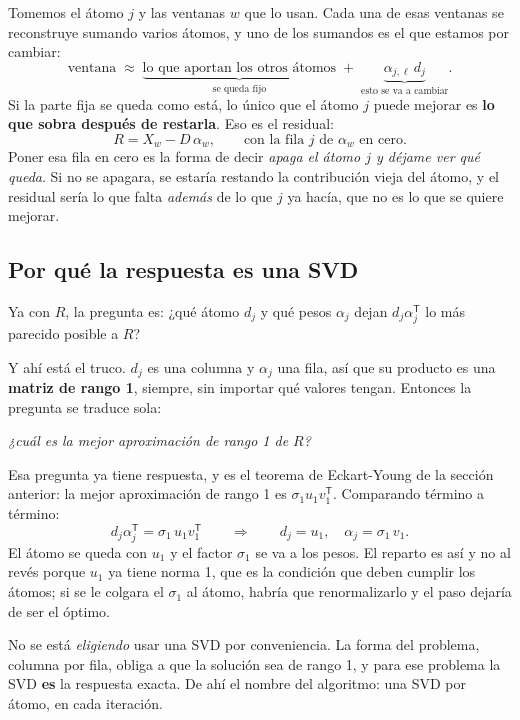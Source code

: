 \documentclass[11pt,letterpaper]{article}
\newcommand{\T}{^{\mathsf{T}}}
\begin{document}
Tomemos el átomo $j$ y las ventanas $w$ que lo usan. Cada una de esas
ventanas se reconstruye sumando varios átomos, y uno de los sumandos
es el que estamos por cambiar:
\[
    \text{ventana} \;\approx\;
    \underbrace{\text{lo que aportan los otros átomos}}
               _{\text{se queda fijo}}
    \;+\;
    \underbrace{\alpha_{j,\ell}\, d_j}_{\text{esto se va a cambiar}} .
\]
Si la parte fija se queda como está, lo único que el átomo $j$ puede
mejorar es \textbf{lo que sobra después de restarla}. Eso es el
residual:
\[
    R = X_w - D\,\alpha_w ,
    \qquad \text{con la fila } j \text{ de } \alpha_w \text{ en cero.}
\]
Poner esa fila en cero es la forma de decir \emph{apaga el átomo $j$ y
déjame ver qué queda}. Si no se apagara, se estaría restando la
contribución vieja del átomo, y el residual sería lo que falta
\emph{además} de lo que $j$ ya hacía, que no es lo que se quiere
mejorar.

\subsection*{Por qué la respuesta es una SVD}

Ya con $R$, la pregunta es: ¿qué átomo $d_j$ y qué pesos $\alpha_j$
dejan $d_j \alpha_j\T$ lo más parecido posible a $R$?

Y ahí está el truco. $d_j$ es una columna y $\alpha_j$ una fila, así
que su producto es una \textbf{matriz de rango 1}, siempre, sin
importar qué valores tengan. Entonces la pregunta se traduce sola:
\begin{center}
    \emph{¿cuál es la mejor aproximación de rango 1 de $R$?}
\end{center}
Esa pregunta ya tiene respuesta, y es el teorema de Eckart-Young de la
sección anterior: la mejor aproximación de rango 1 es
$\sigma_1 u_1 v_1\T$. Comparando término a término:
\[
    d_j \alpha_j\T = \sigma_1\, u_1 v_1\T
    \qquad\Longrightarrow\qquad
    d_j = u_1 , \quad \alpha_j = \sigma_1\, v_1 .
\]
El átomo se queda con $u_1$ y el factor $\sigma_1$ se va a los pesos.
El reparto es así y no al revés porque $u_1$ ya tiene norma 1, que es
la condición que deben cumplir los átomos; si se le colgara el
$\sigma_1$ al átomo, habría que renormalizarlo y el paso dejaría de
ser el óptimo.

\begin{idea}
    No se está \emph{eligiendo} usar una SVD por conveniencia. La
    forma del problema, columna por fila, obliga a que la solución sea
    de rango 1, y para ese problema la SVD \textbf{es} la respuesta
    exacta. De ahí el nombre del algoritmo: una SVD por átomo, en cada
    iteración.
\end{idea}
\end{document}
